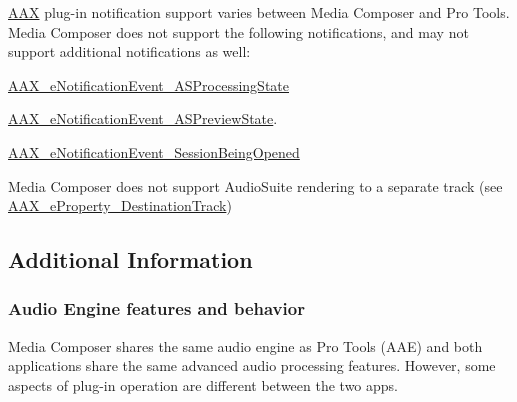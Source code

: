 \begin{DoxyItemize}
\item \hyperlink{a00288}{A\+A\+X} plug-\/in notification support varies between Media Composer and Pro Tools. Media Composer does not support the following notifications, and may not support additional notifications as well\+: \begin{DoxyItemize}
\item \hyperlink{a00206_afab5ea2cfd731fc8f163b6caa685406eaa55c7e25741c0d4f81cc49394e96a43c}{A\+A\+X\+\_\+e\+Notification\+Event\+\_\+\+A\+S\+Processing\+State} \item \hyperlink{a00206_afab5ea2cfd731fc8f163b6caa685406ea8ca3f7d5e93eecf945682f6fc55f5263}{A\+A\+X\+\_\+e\+Notification\+Event\+\_\+\+A\+S\+Preview\+State}. \item \hyperlink{a00206_afab5ea2cfd731fc8f163b6caa685406ea013a21c2c111bac54b962b40f1b4bc1f}{A\+A\+X\+\_\+e\+Notification\+Event\+\_\+\+Session\+Being\+Opened}\end{DoxyItemize}



\item Media Composer does not support Audio\+Suite rendering to a separate track (see \hyperlink{a00283_a6571f4e41a5dd06e4067249228e2249eadd8839e5678c8880215e318197cc8d3a}{A\+A\+X\+\_\+e\+Property\+\_\+\+Destination\+Track})  
\end{DoxyItemize}



 \hypertarget{a00361_aax_media_composer_guide__additional_information}{}\subsection{Additional Information}\label{a00361_aax_media_composer_guide__additional_information}
 \hypertarget{a00361_subsection__aax_media_composer_guide__audio_engine}{}\subsubsection{Audio Engine features and behavior}\label{a00361_subsection__aax_media_composer_guide__audio_engine}
Media Composer shares the same audio engine as Pro Tools (A\+A\+E) and both applications share the same advanced audio processing features. However, some aspects of plug-\/in operation are different between the two apps.


